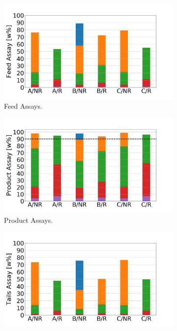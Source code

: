 \begin{figure}[h!]
    \centering
    \begin{subfigure}[t]{0.45\textwidth}
        \centering
        \includegraphics[scale=0.2]{feed_assays}
        \caption{Feed Assays.}
        \label{sfig:feed_assay}
    \end{subfigure}%
    \begin{subfigure}[t]{0.45\textwidth}
        \centering
        \includegraphics[scale=0.2]{product_assays}
        \caption{Product Assays.}
        \label{sfig:product_assay}
    \end{subfigure}
    \begin{subfigure}[t]{0.45\textwidth}
        \centering
        \includegraphics[scale=0.2]{tails_assays}

\end{subfigure}
\end{figure}
